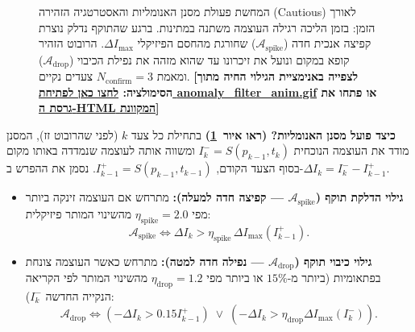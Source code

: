 \documentclass[11pt, a4paper]{article}
\begin{document}
\begin{figure}[H]
\begin{otherlanguage}{english}
\end{otherlanguage}
\caption{המחשת פעולת מסנן האנומליות והאסטרטגיה הזהירה (\foreignlanguage{english}{Cautious}) לאורך הזמן: בזמן הליכה רגילה העוצמה משתנה במתינות. ברגע שהתוקף נדלק נוצרת קפיצה אנכית חדה ($\mathcal{A}_{\text{spike}}$) שחורגת מהחסם הפיזיקלי $\Delta I_{\max}$. הרובוט הזהיר קופא במקום ונועל את זיכרונו עד שהוא מזהה את נפילת הכיבוי ($\mathcal{A}_{\text{drop}}$) ומאמת $N_{\text{confirm}}=3$ צעדים נקיים. \textbf{[לצפייה באנימציית הגילוי החיה מתוך הסימולציה: \href{run:anomaly_filter_anim.gif}{לחצו כאן לפתיחת \foreignlanguage{english}{anomaly\_filter\_anim.gif}} או פתחו את \href{run:accessible_paper_online.html}{גרסת ה-\foreignlanguage{english}{HTML} המקוונת}]}}
\label{fig:anomaly_filter}
\end{figure}

\noindent\textbf{כיצד פועל מסנן האנומליות? (ראו איור~\ref{fig:anomaly_filter})}
בתחילת כל צעד $k$ (לפני שהרובוט זז), המסנן מודד את העוצמה הנוכחית $I_k^- = S(p_{k-1}, t_k)$ ומשווה אותה לעוצמה שנמדדה באותו מקום בסוף הצעד הקודם, $I_{k-1}^+ = S(p_{k-1}, t_{k-1})$. נסמן את ההפרש ב-$\Delta I_k = I_k^- - I_{k-1}^+$.
\begin{itemize}
    \item \textbf{גילוי הדלקת תוקף ($\mathcal{A}_{\text{spike}}$ — קפיצה חדה למעלה):} מתרחש אם העוצמה זינקה ביותר מפי $\eta_{\text{spike}} = 2.0$ מהשינוי המותר פיזיקלית:
    \begin{equation}
        \mathcal{A}_{\text{spike}} \iff \Delta I_k > \eta_{\text{spike}}\,\Delta I_{\max}(I_{k-1}^+). \label{eq:spike}
    \end{equation}
    \item \textbf{גילוי כיבוי תוקף ($\mathcal{A}_{\text{drop}}$ — נפילה חדה למטה):} מתרחש כאשר העוצמה צונחת בפתאומיות (ביותר מ-$15\%$ או ביותר מפי $\eta_{\text{drop}} = 1.2$ מהשינוי המותר לפי הקריאה הנקייה החדשה $I_k^-$):
    \begin{equation}
        \mathcal{A}_{\text{drop}} \iff (-\Delta I_k > 0.15 I_{k-1}^+) \;\lor\; (-\Delta I_k > \eta_{\text{drop}}\Delta I_{\max}(I_k^-)). \label{eq:drop}
    \end{equation}
\end{itemize}
\end{document}
